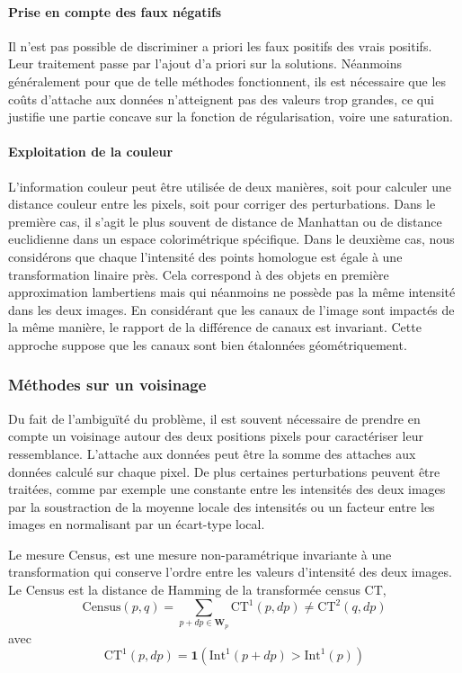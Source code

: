 \documentclass[../main/These_Mathias_Paget.tex]{subfiles}
\begin{document}
\paragraph*{Prise en compte des faux négatifs}
Il n'est pas possible de discriminer a priori les faux positifs des vrais positifs. Leur traitement passe par l'ajout d'a priori sur la solutions. Néanmoins généralement pour que de telle méthodes fonctionnent, ils est nécessaire que les coûts d'attache aux données n'atteignent pas des valeurs trop grandes, ce qui justifie une partie concave sur la fonction de régularisation, voire une saturation.

\paragraph*{Exploitation de la couleur}
L'information couleur peut être utilisée de deux manières, soit pour calculer une distance couleur entre les pixels, soit pour corriger des perturbations. Dans le première cas, il s'agit le plus souvent de distance de Manhattan ou de distance euclidienne dans un espace colorimétrique spécifique. Dans le deuxième cas, nous considérons que chaque l'intensité des points homologue est égale à une transformation linaire près. Cela correspond à des objets en première approximation lambertiens mais qui néanmoins ne possède pas la même intensité dans les deux images. En considérant que les canaux de l'image sont impactés de la même manière, le rapport de la différence de canaux est invariant. Cette approche suppose que les canaux sont bien étalonnées géométriquement.

\subsubsection{Méthodes sur un voisinage}

Du fait de l’ambiguïté du problème, il est souvent nécessaire de prendre en compte un voisinage autour des deux positions pixels pour caractériser leur ressemblance. L'attache aux données peut être la somme des attaches aux données calculé sur chaque pixel. De plus certaines perturbations peuvent être traitées, comme par exemple une constante entre les intensités des deux images par la soustraction de la moyenne locale des intensités ou un facteur entre les images en normalisant par un écart-type local.

Le mesure Census, est une mesure non-paramétrique invariante à une transformation qui conserve l'ordre entre les valeurs d'intensité des deux images. Le Census est la distance de Hamming de la transformée census CT,
\begin{equation}
\text{Census}(p,q) = \sum_{p{+}dp \in \boldsymbol{W}_p}{\text{CT}^1(p,dp) \neq \text{CT}^2(q,dp)}
\end{equation}
avec
\begin{equation}
\text{CT}^1(p,dp) = \mathbf{1}(\text{Int}^1(p{+}dp) > \text{Int}^1(p))
\end{equation}
\end{document}
